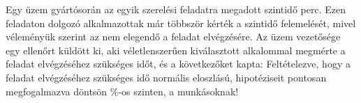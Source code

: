 Egy üzem gyártósorán az egyik szerelési feladatra megadott szintidő 
 perc. Ezen feladaton dolgozó alkalmazottak már többször 
kérték a szintidő felemelését, mivel véleményük szerint az nem 
elegendő a feladat elvégzésére. Az üzem vezetősége egy ellenőrt 
küldött ki, aki  véletlenszerűen kiválasztott alkalommal 
megmérte a feladat elvégzéséhez szükséges időt, és a következőket kapta:
Feltételezve, hogy a feladat elvégzéséhez szükséges idő normális eloszlású,
hipotéziseit pontosan megfogalmazva döntsön \%-os szinten, 
 a munkásoknak!